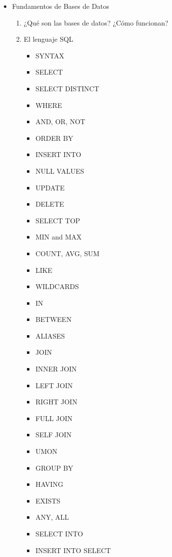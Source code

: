 \documentclass[12pt, letterpaper]{article}
\begin{document}
\begin{enumerate}
\begin{itemize}
        \item Fundamentos de Bases de Datos
        \begin{enumerate}
            \item ¿Qué son las bases de datos? ¿Cómo funcionan?
            \item El lenguaje SQL
            \begin{itemize}
                \item SYNTAX
                \item SELECT
                \item SELECT DISTINCT
                \item WHERE
                \item AND, OR, NOT
                \item ORDER BY
                \item INSERT INTO
                \item NULL VALUES
                \item UPDATE
                \item DELETE
                \item SELECT TOP
                \item MIN and MAX
                \item COUNT, AVG, SUM
                \item LIKE
                \item WILDCARDS
                \item IN
                \item BETWEEN
                \item ALIASES
                \item JOIN
                \item INNER JOIN
                \item LEFT JOIN
                \item RIGHT JOIN
                \item FULL JOIN
                \item SELF JOIN
                \item UMON
                \item GROUP BY
                \item HAVING
                \item EXISTS
                \item ANY, ALL
                \item SELECT INTO
                \item INSERT INTO SELECT

\end{itemize}
\end{enumerate}
\end{itemize}
\end{enumerate}
\end{document}
